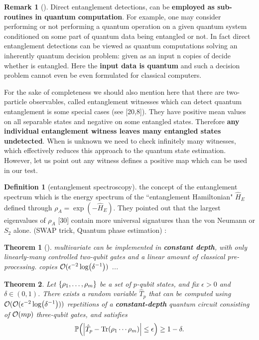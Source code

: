 \documentclass[
10pt,
aps,
pra,
linenumbers,
floatfix,
]{revtex4-2}
\theoremstyle{plain}
\newtheorem{theorem}{Theorem}
\theoremstyle{definition}
\newtheorem{definition}{Definition}
\newtheorem{remark}{Remark}
\newcommand{\hamiltonian}{\hat{H}}
\newcommand{\dm}{\rho}
\begin{document}
\begin{remark}[\cite{horodeckiDirectDetectionQuantum2002}]
	Direct entanglement detections, can be \textbf{employed as sub-routines in quantum computation}. For example, one may consider performing or not performing a quantum operation on a given quantum system conditioned on some part of quantum data being entangled or not. In fact direct entanglement detections can be viewed as quantum computations solving an inherently quantum decision problem: given as an input n copies of decide whether is entangled. Here the \textbf{input data is quantum} and such a decision problem cannot even be even formulated for classical computers. 

	For the sake of completeness we should also mention here that there are two-particle observables, called entanglement witnesses which can detect quantum entanglement is some special cases (see [20,8]). They have positive mean values on all separable states and negative on some entangled states. Therefore \textbf{any individual entanglement witness leaves many entangled states undetected}. When is unknown we need to check inﬁnitely many witnesses, which eﬀectively reduces this approach to the quantum state estimation. However, let us point out any witness deﬁnes a positive map which can be used in our test.
\end{remark}
\begin{definition}[entanglement spectroscopy]\label{def:entanglement_spectroscopy}
	the concept of the entanglement spectrum which is the energy spectrum of the ``entanglement Hamiltonian" $\hamiltonian_E$ defined through $\dm_A = \exp(−\hamiltonian_E )$. They pointed out that the largest eigenvalues of $\dm_A$ [30] contain more universal signatures than the von Neumann  or $S_2$ alone. (SWAP trick, Quantum phase estimation)
	\cite{johriEntanglementSpectroscopyQuantum2017}:
\end{definition}

\begin{theorem}[\cite{quekMultivariateTraceEstimation2022}]\label{thm:multivariate_trace}
	multivariate  can be implemented in \textbf{constant depth}, with only linearly-many controlled two-qubit gates and a linear amount of classical pre-processing.
	copies $\mathcal{O}(\epsilon^{-2}\log( \delta^{-1}))$ ...
\end{theorem}
\begin{theorem}
	Let $\qty{\dm_1,\dots,\dm_m}$ be a set of $p$-qubit states, and fix $\epsilon > 0$ and $\delta \in (0,1)$.
	There exists a random variable $\hat{T}_p$ that can be computed using $\mathcal{O}(\mathcal{O}(\epsilon^{-2}\log( \delta^{-1})))$ repetitions of a \textbf{constant-depth} quantum circuit consisting of $\mathcal{O}(mp)$ three-qubit gates, and satisfies 
	\begin{equation}
		\probability\qty(\abs{\hat{T}_p - \Tr(\dm_1\cdots\dm_m)}\le \epsilon) \ge 1 -\delta.
	\end{equation}
\end{theorem}
\end{document}
